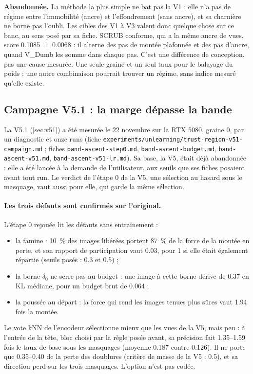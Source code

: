\documentclass[11pt,a4paper]{article}
\newcommand{\chemin}[1]{\nolinkurl{#1}}%
\begin{document}
\begin{retenir}
\textbf{Abandonnée.} La méthode la plus simple ne bat pas la V1 : elle n'a pas de régime entre
l'immobilité (ancre) et l'effondrement (sans ancre), et sa charnière ne borne pas l'oubli. Les cibles
des V1 à V3 valent donc quelque chose sur ce banc, au sens posé par sa fiche. SCRUB conforme, qui a la
même ancre de vues, score \num{0.1085 +- 0.0068} : il alterne des pas de montée plafonnée et des pas
d'ancre, quand V\_Dumb les somme dans chaque pas. C'est une différence de conception, pas une cause
mesurée. Une seule graine et un seul taux pour le balayage du poids : une autre combinaison pourrait
trouver un régime, sans indice mesuré qu'elle existe.
\end{retenir}

\subsection{Campagne V5.1 : la marge dépasse la bande}\label{sec:campagnev51}
La V5.1 (\cref{sec:v51}) a été mesurée le 22 novembre sur la RTX 5080, graine 0, par un diagnostic et
onze runs (fiche \chemin{experiments/unlearning/trust-region-v51-campaign.md} ; fiches
\chemin{band-ascent-step0.md}, \chemin{band-ascent-budget.md}, \chemin{band-ascent-v51.md},
\chemin{band-ascent-v51-lr.md}). Sa base, la V5, était déjà abandonnée : elle a été lancée à la demande
de l'utilisateur, aux seuils que ses fiches posaient avant tout run. Le verdict de l'étape 0 de la V5,
une sélection au hasard sous le masquage, vaut aussi pour elle, qui garde la même sélection.

\paragraph{Les trois défauts sont confirmés sur l'original.} L'étape 0 rejouée lit les défauts sans
entraînement :
\begin{itemize}[leftmargin=1.2em,itemsep=1pt]
  \item la famine : \SI{10}{\percent} des images libérées portent \SI{87}{\percent} de la force de la
    montée en perte, et son rapport de participation vaut \num{0.03}, pour 1 si elle était également
    répartie (seuils posés : \num{0.3} et \num{0.5}) ;
  \item la borne $\delta_0$ ne serre pas au budget : une image à cette borne dérive de \num{0.37} en
    KL médiane, pour un budget brut de \num{0.064} ;
  \item la poussée au départ : la force qui rend les images tenues plus sûres vaut \num{1.94} fois
    la montée.
\end{itemize}
Le vote kNN de l'encodeur sélectionne mieux que les vues de la V5, mais peu : à l'entrée de la tête,
bloc choisi par la règle posée avant, sa précision fait \numrange{1.35}{1.59} fois le taux de base
sous les masquages (moyenne \num{0.187} contre \num{0.126}). Il ne porte que
\numrange{0.35}{0.40} de la perte des doublures (critère de masse de la V5 : \num{0.5}), et sa
direction perd sur les trois masquages. L'option n'est pas codée.
\end{document}
